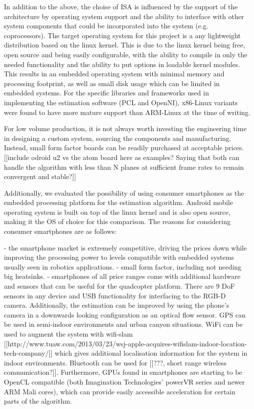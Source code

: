 \documentclass[]{article}
\begin{document}
{In addition to the above, the choise of ISA is influenced by the support of the architecture by operating system support and the ability to interface with other system components that could be incorporated into the system (e.g. coprocessors). The target operating system for this project is a any lightweight distribution based on the linux kernel. This is due to the linux kernel being free, open source and being easily configurable, with the ability to compile in only the needed functionality and the ability to put options in loadable kernel modules. This results in an embedded operating system with minimal memory and processing footprint, as well as small disk usage which can be limited in embedded systems. For the specific libraries and frameworks used in implementing the estimation software (PCL and OpenNI), x86-Linux variants were found to have more mature support than ARM-Linux at the time of writing.

For low volume production, it is not always worth investing the engineering time in designing a custom system, sourcing the components and manufacturing. Instead, small form factor boards can be readily purchased at acceptable prices. [[include odroid u2 vs the atom board here as examples? Saying that both can handle the algorithm with less than N planes at sufficient frame rates to remain convergent and stable?]]

Additionally, we evaluated the possibility of using consumer smartphones as the embedded processing platform for the estimation algorithm. Android mobile operating system is built on top of the linux kernel and is also open source, making it the OS of choice for this comparison. The reasons for considering consumer smartphones are as follows:

- the smartphone market is extremely competitive, driving the prices down while improving the processing power to levels compatible with embedded systems usually seen in robotics applications.
- small form factor, including not needing big heatsinks.
- smartphones of all price ranges come with additional hardware and sensors that can be useful for the quadcopter platform. There are 9 DoF sensors in any device and USB functionality for interfacing to the RGB-D camera. Additionally, the estimation can be improved by using the phone's camera in a downwards looking configuration as an optical flow sensor. GPS can be used in semi-indoor environments and urban canyon situations. WiFi can be used to augment the system with wifi-slam [[http://www.tuaw.com/2013/03/23/wsj-apple-acquires-wifislam-indoor-location-tech-company/]] which gives additional localisation information for the system in indoor environments. Bluetooth can be used for [[???, short range wireless communication?]]. Furthermore, GPUs found in smartphones are starting to be OpenCL compatible (both Imagination Technologies' powerVR series and newer ARM Mali cores), which can provide easily accessible acceleration for certain parts of the algorithm.

}
\end{document}
